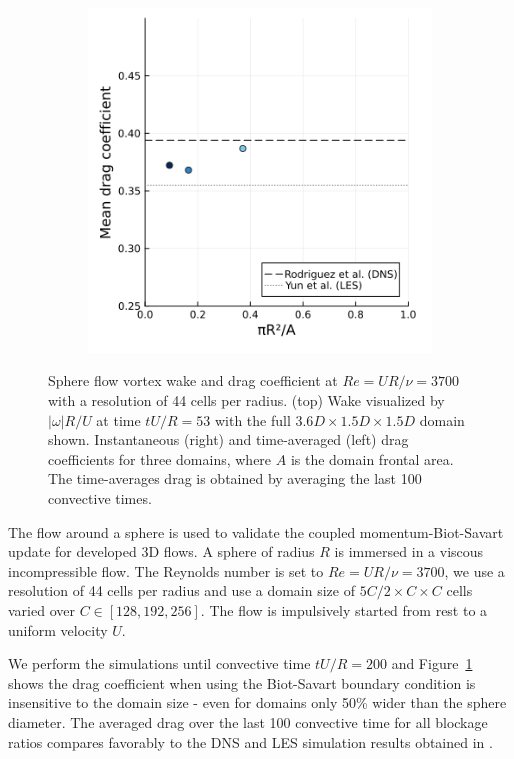 \documentclass[final,1p,times]{elsarticle}
\begin{document}
\begin{figure}
    \begin{subfigure}{.4\textwidth}
        \centering
        \includegraphics[width=\textwidth]{tex/fig/validation_sphere.png}
    \end{subfigure}
    \caption{Sphere flow vortex wake and drag coefficient at $Re = UR/\nu= 3700$ with a resolution of 44 cells per radius. (top) Wake visualized by $|\omega|R/U$ at time $tU/R=53$ with the full $3.6D\times1.5D\times1.5D$ domain shown. Instantaneous (right) and time-averaged (left) drag coefficients for three domains, where $A$ is the domain frontal area. The time-averages drag is obtained by averaging the last 100 convective times.}
    \label{fig:sphere}
\end{figure}

The flow around a sphere is used to validate the coupled momentum-Biot-Savart update for developed 3D flows. A sphere of radius $R$ is immersed in a viscous incompressible flow. The Reynolds number is set to $Re=UR/\nu=3700$, we use a resolution of 44 cells per radius and use a domain size of $5C/2 \times C \times C$ cells varied over $C\in[128,192,256]$. The flow is impulsively started from rest to a uniform velocity $U$. 

We perform the simulations until convective time $tU/R=200$ and Figure~\ref{fig:sphere} shows the drag coefficient when using the Biot-Savart boundary condition is insensitive to the domain size - even for domains only 50\% wider than the sphere diameter. The averaged drag over the last 100 convective time for all blockage ratios compares favorably to the DNS and LES simulation results obtained in \cite{Yun2006VorticalNumbers, Rodriguez2011Direct3700}. 
\end{document}
